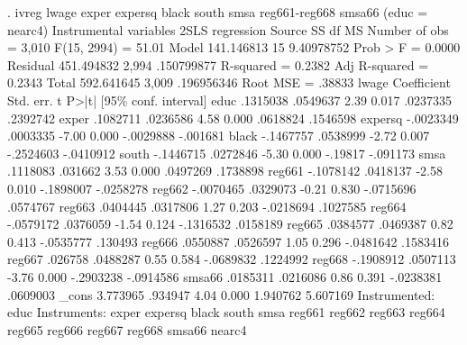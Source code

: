 . ivreg lwage exper expersq black south smsa reg661-reg668 smsa66 (educ = nearc4)
{\smallskip}
Instrumental variables 2SLS regression
{\smallskip}
      Source {\VBAR}       SS           df       MS      Number of obs   =     3,010
   F(15, 2994)     =     51.01
       Model {\VBAR}  141.146813        15  9.40978752   Prob > F        =    0.0000
    Residual {\VBAR}  451.494832     2,994  .150799877   R-squared       =    0.2382
   Adj R-squared   =    0.2343
       Total {\VBAR}  592.641645     3,009  .196956346   Root MSE        =    .38833
{\smallskip}
       lwage {\VBAR} Coefficient  Std. err.      t    P>|t|     [95\% conf. interval]
        educ {\VBAR}   .1315038   .0549637     2.39   0.017     .0237335    .2392742
       exper {\VBAR}   .1082711   .0236586     4.58   0.000     .0618824    .1546598
     expersq {\VBAR}  -.0023349   .0003335    -7.00   0.000    -.0029888    -.001681
       black {\VBAR}  -.1467757   .0538999    -2.72   0.007    -.2524603   -.0410912
       south {\VBAR}  -.1446715   .0272846    -5.30   0.000      -.19817    -.091173
        smsa {\VBAR}   .1118083    .031662     3.53   0.000     .0497269    .1738898
      reg661 {\VBAR}  -.1078142   .0418137    -2.58   0.010    -.1898007   -.0258278
      reg662 {\VBAR}  -.0070465   .0329073    -0.21   0.830    -.0715696    .0574767
      reg663 {\VBAR}   .0404445   .0317806     1.27   0.203    -.0218694    .1027585
      reg664 {\VBAR}  -.0579172   .0376059    -1.54   0.124    -.1316532    .0158189
      reg665 {\VBAR}   .0384577   .0469387     0.82   0.413    -.0535777     .130493
      reg666 {\VBAR}   .0550887   .0526597     1.05   0.296    -.0481642    .1583416
      reg667 {\VBAR}    .026758   .0488287     0.55   0.584    -.0689832    .1224992
      reg668 {\VBAR}  -.1908912   .0507113    -3.76   0.000    -.2903238   -.0914586
      smsa66 {\VBAR}   .0185311   .0216086     0.86   0.391    -.0238381    .0609003
       _cons {\VBAR}   3.773965    .934947     4.04   0.000     1.940762    5.607169
Instrumented: educ
 Instruments: exper expersq black south smsa reg661 reg662 reg663 reg664
              reg665 reg666 reg667 reg668 smsa66 nearc4
{\smallskip}
